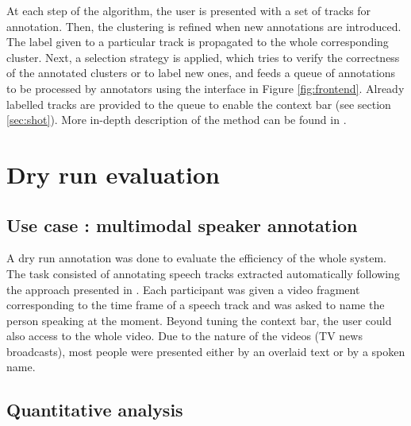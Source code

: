 \documentclass[a4paper]{article}
\begin{document}
At each step of the algorithm, the user is presented with a set of tracks for annotation. Then, the clustering is refined when new annotations are introduced.
The label given to a particular track is propagated to the whole corresponding cluster. Next, a selection strategy is applied, which tries to verify the correctness of the annotated clusters or to label new ones, and feeds a queue of annotations to be processed by annotators using the interface in Figure \ref{fig:frontend}. Already labelled tracks are provided to the queue to enable the context bar (see section \ref{sec:shot}). 
More in-depth description of the method can be found in \cite{budnik2014automatic}.

%


  \section{Dry run evaluation}
      \subsection{Use case : multimodal speaker annotation}
     

A dry run annotation was done to evaluate the efficiency of the whole system. The task consisted of annotating speech tracks extracted automatically following the approach presented in \cite{barras2006multistage}.
Each participant was given a video fragment corresponding to the time frame of a speech track and was asked to name the person speaking at the moment.
Beyond tuning the context bar, the user could also access to the whole video. Due to the nature of the videos (TV news broadcasts), most people were presented either by an overlaid text or by a spoken name.
 
      
      \subsection{Quantitative analysis}
 
\end{document}
